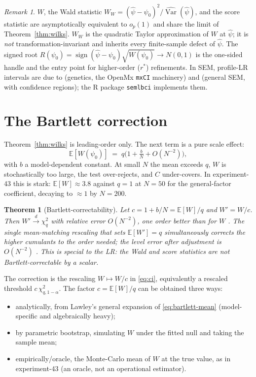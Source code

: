 \documentclass[11pt]{article}
\newcommand{\E}{\mathbb{E}}
\newcommand{\Var}{\operatorname{Var}}
\theoremstyle{plain}
\newtheorem{theorem}{Theorem}
\theoremstyle{remark}
\newtheorem*{remark}{Remark}
\begin{document}
\begin{remark}
$W$, the Wald statistic $W_W = (\hat\psi - \psi_0)^2/\widehat{\Var}(\hat\psi)$,
and the score statistic are asymptotically equivalent to $o_p(1)$ and share the
limit of Theorem~\ref{thm:wilks}. $W_W$ is the quadratic Taylor approximation of
$W$ at $\hat\psi$; it is \emph{not} transformation-invariant and inherits every
finite-sample defect of $\hat\psi$. The signed root
$R(\psi_0) = \operatorname{sign}(\hat\psi - \psi_0)\sqrt{W(\psi_0)} \to N(0,1)$ is
the one-sided handle and the entry point for higher-order ($r^*$) refinements.
In SEM, profile-LR intervals are due to \cite{nealemiller1997} (genetics, the
OpenMx \texttt{mxCI} machinery) and \cite{pekwu2015} (general SEM, with
confidence regions); the R package \texttt{semlbci} implements them.
\end{remark}

\section{The Bartlett correction}
\label{sec:bartlett}

Theorem~\ref{thm:wilks} is leading-order only. The next term is a pure scale
effect:
%
\begin{equation}
\label{eq:bartlett-mean}
\E[W(\psi_0)] \;=\; q\Big(1 + \tfrac{b}{N} + O(N^{-2})\Big),
\end{equation}
%
with $b$ a model-dependent constant. At small $N$ the mean exceeds $q$, $W$ is
stochastically too large, the test over-rejects, and $C$ under-covers. In
experiment-43 this is stark: $\E[W] \approx 3.8$ against $q = 1$ at $N = 50$ for
the general-factor coefficient, decaying to $\approx 1$ by $N = 200$.

\begin{theorem}[Bartlett-correctability]
\label{thm:bartlett}
Let $c = 1 + b/N = \E[W]/q$ and $W' = W/c$. Then $W' \xrightarrow{d} \chi^2_q$
with relative error $O(N^{-2})$, one order better than for $W$
\cite{bartlett1937,lawley1956}. The single mean-matching rescaling that sets
$\E[W'] = q$ simultaneously corrects the higher cumulants to the order needed; the
level error after adjustment is $O(N^{-2})$ \cite{barndorffnielsencox1984,
barndorffnielsenhall1988}. This is special to the LR: the Wald and score
statistics are not Bartlett-correctable by a scalar.
\end{theorem}

The correction is the rescaling $W \mapsto W/c$ in \eqref{eq:ci}, equivalently a
rescaled threshold $c\,\chi^2_{q,1-\alpha}$. The factor $c = \E[W]/q$ can be
obtained three ways:
\begin{itemize}
\item analytically, from Lawley's general expansion of \eqref{eq:bartlett-mean}
(model-specific and algebraically heavy);
\item by parametric bootstrap, simulating $W$ under the fitted null and taking the
sample mean;
\item empirically/oracle, the Monte-Carlo mean of $W$ at the true value, as in
experiment-43 (an oracle, not an operational estimator).
\end{itemize}
\end{document}
